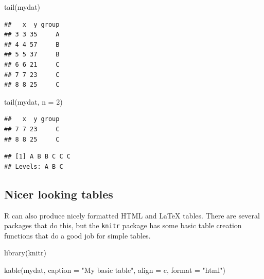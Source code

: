 \documentclass[
]{book}
\newenvironment{Shaded}{\begin{snugshade}}{\end{snugshade}}
\newcommand{\AttributeTok}[1]{\textcolor[rgb]{0.77,0.63,0.00}{#1}}
\newcommand{\DecValTok}[1]{\textcolor[rgb]{0.00,0.00,0.81}{#1}}
\newcommand{\FunctionTok}[1]{\textcolor[rgb]{0.00,0.00,0.00}{#1}}
\newcommand{\NormalTok}[1]{#1}
\newcommand{\SpecialCharTok}[1]{\textcolor[rgb]{0.00,0.00,0.00}{#1}}
\newcommand{\StringTok}[1]{\textcolor[rgb]{0.31,0.60,0.02}{#1}}
\begin{document}
\begin{Shaded}
\begin{Highlighting}[]
\FunctionTok{tail}\NormalTok{(mydat)}
\end{Highlighting}
\end{Shaded}

\begin{verbatim}
##   x  y group
## 3 3 35     A
## 4 4 57     B
## 5 5 37     B
## 6 6 21     C
## 7 7 23     C
## 8 8 25     C
\end{verbatim}

\begin{Shaded}
\begin{Highlighting}[]
\FunctionTok{tail}\NormalTok{(mydat, }\AttributeTok{n =} \DecValTok{2}\NormalTok{)}
\end{Highlighting}
\end{Shaded}

\begin{verbatim}
##   x  y group
## 7 7 23     C
## 8 8 25     C
\end{verbatim}

\begin{Shaded}
\end{Shaded}

\begin{verbatim}
## [1] A B B C C C
## Levels: A B C
\end{verbatim}

\hypertarget{nicer-looking-tables}{%
\subsection{Nicer looking tables}\label{nicer-looking-tables}}

R can also produce nicely formatted HTML and LaTeX tables. There are
several packages that do this, but the \texttt{knitr} package has some basic
table creation functions that do a good job for simple tables.

\begin{Shaded}
\begin{Highlighting}[]
\FunctionTok{library}\NormalTok{(knitr)}

\FunctionTok{kable}\NormalTok{(mydat,}
      \AttributeTok{caption =} \StringTok{"My basic table"}\NormalTok{,}
      \AttributeTok{align =} \StringTok{\textquotesingle{}c\textquotesingle{}}\NormalTok{,  }
      \AttributeTok{format =} \StringTok{"html"}\NormalTok{)}
\end{Highlighting}
\end{Shaded}
\end{document}
